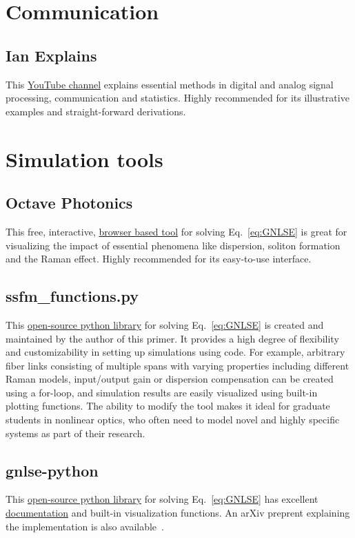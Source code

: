\section{Communication}


\subsection*{Ian Explains}
This \href{https://www.youtube.com/@iain_explains/videos}{YouTube channel} explains essential methods in digital and analog signal processing, communication and statistics. Highly recommended for its illustrative examples and straight-forward derivations.


\section{Simulation tools}

\subsection*{Octave Photonics}
This free, interactive, \href{https://www.octavephotonics.com/nlse}{browser based tool} for solving Eq.~\ref{eq:GNLSE} is great for visualizing the impact of essential phenomena like dispersion, soliton formation and the Raman effect. Highly recommended for its easy-to-use interface.

\subsection*{ssfm\_functions.py}
This \href{https://github.com/OleKrarup123/NLSE-vector-solver/tree/main}{open-source python library} for solving Eq.~\ref{eq:GNLSE} is created and maintained by the author of this primer. It provides a high degree of flexibility and customizability in setting up simulations using code. For example, arbitrary fiber links consisting of multiple spans with varying properties including different Raman models, input/output gain or dispersion compensation can be created using a for-loop, and simulation results are easily visualized using built-in plotting functions. The ability to modify the tool makes it ideal for graduate students in nonlinear optics, who often need to model novel and highly specific systems as part of their research.   

\subsection*{gnlse-python}
This \href{https://github.com/WUST-FOG/gnlse-python}{open-source python library} for solving Eq.~\ref{eq:GNLSE} has excellent \href{https://gnlse.readthedocs.io/en/latest/index.html}{documentation} and built-in visualization functions. An arXiv preprent explaining the implementation is also available~\cite{redman2021gnlsepythonopensourcesoftware}. 

